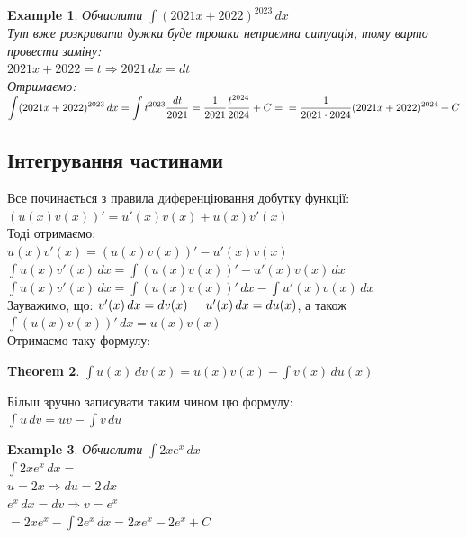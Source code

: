 \documentclass[a4paper, 14pt]{extarticle}
\def\huge{\displaystyle}
\def\bigline{\vspace{5mm}\\}
\theoremstyle{theoremdd}
\newtheorem{theorem}{Theorem}[subsection]
\theoremstyle{theoremdd}
\theoremstyle{theoremdd}
\theoremstyle{theoremdd}
\newtheorem{example}[theorem]{Example}
\theoremstyle{theoremdd}
\theoremstyle{theoremdd}
\theoremstyle{theoremdd}
\theoremstyle{theoremdd}
\begin{document}
\begin{example}
Обчислити $\huge \int (2021x + 2022)^{2023} \,dx$\\
Тут вже розкривати дужки буде трошки неприємна ситуація, тому варто провести заміну:\\
$2021x + 2022 = t \Rightarrow 2021 \,dx = dt$\\
Отримаємо:\\
$\huge \int (2021x + 2022)^{2023} \,dx = \int t^{2023} \dfrac{dt}{2021} = \dfrac{1}{2021} \dfrac{t^{2024}}{2024} + C = \\ = \dfrac{1}{2021 \cdot 2024} (2021x+2022)^{2024} + C$
\end{example}
\medskip

\subsection{Інтегрування частинами}
Все починається з правила диференціювання добутку функції:\\
$(u(x)v(x))'=u'(x)v(x) + u(x)v'(x)$\\
Тоді отримаємо:\\
$u(x)v'(x) = (u(x)v(x))'-u'(x)v(x)$\\
$\huge \int u(x)v'(x) \,dx = \int (u(x)v(x))'-u'(x)v(x) \,dx$\\
$\huge \int u(x)v'(x) \,dx = \int (u(x)v(x))'\,dx - \int u'(x)v(x)\,dx$\\
Зауважимо, що: $v'(x)\,dx = dv(x) \hspace{0.5cm} u'(x)\,dx = du(x)$, а також\\
$\huge \int (u(x)v(x))'\,dx = u(x)v(x)$\\
Отримаємо таку формулу:
\begin{theorem}
$\huge \int u(x)\,dv(x) = u(x)v(x) - \int v(x)\,du(x)$\\
\end{theorem}
Більш зручно записувати таким чином цю формулу:\\
$\huge \int u\,dv = uv - \int v\,du$
\bigline

\begin{example}
Обчислити $\huge \int 2x e^x \,dx$\\
$\huge \int 2x e^x \,dx =$\\
$u = 2x \Rightarrow du = 2\,dx$\\
$e^x\,dx = dv \Rightarrow v = e^x$\\
$= 2xe^x - \huge \int 2e^x \,dx = 2xe^x - 2e^x + C$
\end{example}
\end{document}
